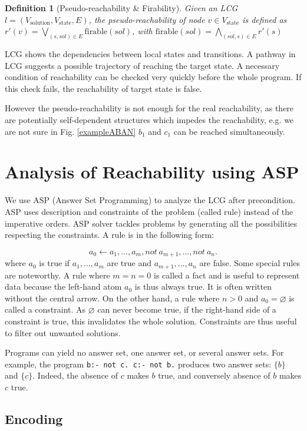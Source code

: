 \documentclass[en]{jdoc}
\newtheorem{definition}{Definition}
\begin{document}
\begin{definition}[Pseudo-reachability \& Firability]
Given an LCG $l=(V_{\text{solution}},V_{\text{state}}, E)$, the pseudo-reachability of node $v\in V_{\text{state}}$ is defined as 
$r'(v)=\bigvee_{(s,sol) \in E} \text{firable}(sol)$, with $\text{firable}(sol)=\bigwedge_{(sol,s)\in E} r'(s)$
\end{definition}\label{defPseudoReach}
LCG shows the dependencies between local states and transitions.
A pathway in LCG suggests a possible trajectory of reaching the target state.
A necessary condition of reachability can be checked very quickly before the whole program.
If this check fails, the reachability of target state is false.

However the pseudo-reachability is not enough for the real reachability, as there are potentially self-dependent structures which impedes the reachability, e.g. we are not sure in Fig. \ref{exampleABAN} $b_1$ and $c_1$ can be reached simultaneously.

\section{Analysis of Reachability using ASP}
We use ASP  (Answer Set Programming) \cite{baral2003knowledge} to analyze the LCG after precondition. 
ASP uses description and constraints of the problem (called rule) instead of the imperative orders. 
ASP solver tackles problems by generating all the possibilities respecting the constraints. 
A rule is in the following form:

$$a_0 \gets a_1 , \ldots , a_m, not\ a_{m+1}, \ldots , not\ a_n.$$
where $a_0$ is true if $a_1 , \ldots , a_m$ are true and $a_{m+1}, \ldots , a_n$ are false. Some special rules are noteworthy.
A rule where $m = n = 0$ is called a fact and is useful to represent data because the left-hand atom $a_0$ is thus always true. 
It is often written without the central arrow. 
On the other hand, a rule where $n > 0$ and $a_0 = \varnothing$ is called a constraint.
As $\varnothing$ can never become true, if the right-hand side of a constraint is true, this invalidates the whole solution. 
Constraints are thus useful to filter out unwanted solutions.

Programs can yield no answer set, one answer set, or several answer sets. 
For example, the program \texttt{b:- not c. c:- not b.} produces two answer sets: $\{b\}$ and $\{c\}$. 
Indeed, the absence of $c$ makes $b$ true, and conversely absence of $b$ makes $c$ true.
\subsection{Encoding}
\end{document}
